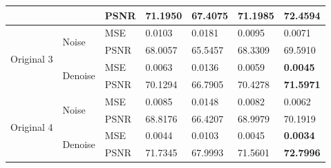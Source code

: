 \begin{center}
\begin{tabular}{llllllllllll|l|l|l|l|l|l|l|l|l|l|l|l|l|}
\multicolumn{4}{|l|}{}                            & \multicolumn{4}{l|}{}                         & \multicolumn{4}{l|}{PSNR} & \multicolumn{3}{l|}{71.1950} & \multicolumn{3}{l|}{67.4075} & \multicolumn{4}{l|}{71.1985}  & \multicolumn{3}{l|}{\textbf{72.4594}} \\ \hline
\multicolumn{4}{|l|}{\multirow{4}{*}{Original 3}} & \multicolumn{4}{l|}{\multirow{2}{*}{Noise}}   & \multicolumn{4}{l|}{MSE}  & \multicolumn{3}{l|}{0.0103}  & \multicolumn{3}{l|}{0.0181}  & \multicolumn{4}{l|}{0.0095}   & \multicolumn{3}{l|}{0.0071}           \\ \cline{9-25} 
\multicolumn{4}{|l|}{}                            & \multicolumn{4}{l|}{}                         & \multicolumn{4}{l|}{PSNR} & \multicolumn{3}{l|}{68.0057} & \multicolumn{3}{l|}{65.5457} & \multicolumn{4}{l|}{68.3309}  & \multicolumn{3}{l|}{69.5910}          \\ \cline{5-25} 
\multicolumn{4}{|l|}{}                            & \multicolumn{4}{l|}{\multirow{2}{*}{Denoise}} & \multicolumn{4}{l|}{MSE}  & \multicolumn{3}{l|}{0.0063}  & \multicolumn{3}{l|}{0.0136}  & \multicolumn{4}{l|}{0.0059}   & \multicolumn{3}{l|}{\textbf{0.0045}}  \\ \cline{9-25} 
\multicolumn{4}{|l|}{}                            & \multicolumn{4}{l|}{}                         & \multicolumn{4}{l|}{PSNR} & \multicolumn{3}{l|}{70.1294} & \multicolumn{3}{l|}{66.7905} & \multicolumn{4}{l|}{70.4278}  & \multicolumn{3}{l|}{\textbf{71.5971}} \\ \hline
\multicolumn{4}{|l|}{\multirow{4}{*}{Original 4}} & \multicolumn{4}{l|}{\multirow{2}{*}{Noise}}   & \multicolumn{4}{l|}{MSE}  & \multicolumn{3}{l|}{0.0085}  & \multicolumn{3}{l|}{0.0148}  & \multicolumn{4}{l|}{0.0082}   & \multicolumn{3}{l|}{0.0062}           \\ \cline{9-25} 
\multicolumn{4}{|l|}{}                            & \multicolumn{4}{l|}{}                         & \multicolumn{4}{l|}{PSNR} & \multicolumn{3}{l|}{68.8176} & \multicolumn{3}{l|}{66.4207} & \multicolumn{4}{l|}{68.9979}  & \multicolumn{3}{l|}{70.1919}          \\ \cline{5-25} 
\multicolumn{4}{|l|}{}                            & \multicolumn{4}{l|}{\multirow{2}{*}{Denoise}} & \multicolumn{4}{l|}{MSE}  & \multicolumn{3}{l|}{0.0044}  & \multicolumn{3}{l|}{0.0103}  & \multicolumn{4}{l|}{0.0045}   & \multicolumn{3}{l|}{\textbf{0.0034}}  \\ \cline{9-25} 
\multicolumn{4}{|l|}{}                            & \multicolumn{4}{l|}{}                         & \multicolumn{4}{l|}{PSNR} & \multicolumn{3}{l|}{71.7345} & \multicolumn{3}{l|}{67.9993} & \multicolumn{4}{l|}{71.5601}  & \multicolumn{3}{l|}{\textbf{72.7996}} \\ \hline

\end{tabular}
\end{center}
